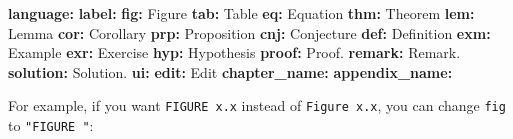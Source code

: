 \documentclass[
  12pt,
]{krantz}
\newenvironment{Shaded}{\begin{snugshade}}{\end{snugshade}}
\newcommand{\AttributeTok}[1]{\textcolor[rgb]{0.13,0.29,0.53}{#1}}
\newcommand{\FunctionTok}[1]{\textcolor[rgb]{0.13,0.29,0.53}{\textbf{#1}}}
\newcommand{\KeywordTok}[1]{\textcolor[rgb]{0.13,0.29,0.53}{\textbf{#1}}}
\newcommand{\StringTok}[1]{\textcolor[rgb]{0.31,0.60,0.02}{#1}}
\theoremstyle{definition}
\theoremstyle{definition}
\theoremstyle{definition}
\theoremstyle{definition}
\theoremstyle{remark}
\begin{document}
\begin{Shaded}
\begin{Highlighting}[]
\FunctionTok{language}\KeywordTok{:}
\AttributeTok{  }\FunctionTok{label}\KeywordTok{:}
\AttributeTok{    }\FunctionTok{fig}\KeywordTok{:}\AttributeTok{ }\StringTok{\textquotesingle{}Figure \textquotesingle{}}
\AttributeTok{    }\FunctionTok{tab}\KeywordTok{:}\AttributeTok{ }\StringTok{\textquotesingle{}Table \textquotesingle{}}
\AttributeTok{    }\FunctionTok{eq}\KeywordTok{:}\AttributeTok{ }\StringTok{\textquotesingle{}Equation \textquotesingle{}}
\AttributeTok{    }\FunctionTok{thm}\KeywordTok{:}\AttributeTok{ }\StringTok{\textquotesingle{}Theorem \textquotesingle{}}
\AttributeTok{    }\FunctionTok{lem}\KeywordTok{:}\AttributeTok{ }\StringTok{\textquotesingle{}Lemma \textquotesingle{}}
\AttributeTok{    }\FunctionTok{cor}\KeywordTok{:}\AttributeTok{ }\StringTok{\textquotesingle{}Corollary \textquotesingle{}}
\AttributeTok{    }\FunctionTok{prp}\KeywordTok{:}\AttributeTok{ }\StringTok{\textquotesingle{}Proposition \textquotesingle{}}
\AttributeTok{    }\FunctionTok{cnj}\KeywordTok{:}\AttributeTok{ }\StringTok{\textquotesingle{}Conjecture \textquotesingle{}}
\AttributeTok{    }\FunctionTok{def}\KeywordTok{:}\AttributeTok{ }\StringTok{\textquotesingle{}Definition \textquotesingle{}}
\AttributeTok{    }\FunctionTok{exm}\KeywordTok{:}\AttributeTok{ }\StringTok{\textquotesingle{}Example \textquotesingle{}}
\AttributeTok{    }\FunctionTok{exr}\KeywordTok{:}\AttributeTok{ }\StringTok{\textquotesingle{}Exercise \textquotesingle{}}
\AttributeTok{    }\FunctionTok{hyp}\KeywordTok{:}\AttributeTok{ }\StringTok{\textquotesingle{}Hypothesis \textquotesingle{}}
\AttributeTok{    }\FunctionTok{proof}\KeywordTok{:}\AttributeTok{ }\StringTok{\textquotesingle{}Proof. \textquotesingle{}}
\AttributeTok{    }\FunctionTok{remark}\KeywordTok{:}\AttributeTok{ }\StringTok{\textquotesingle{}Remark. \textquotesingle{}}
\AttributeTok{    }\FunctionTok{solution}\KeywordTok{:}\AttributeTok{ }\StringTok{\textquotesingle{}Solution. \textquotesingle{}}
\AttributeTok{  }\FunctionTok{ui}\KeywordTok{:}
\AttributeTok{    }\FunctionTok{edit}\KeywordTok{:}\AttributeTok{ Edit}
\AttributeTok{    }\FunctionTok{chapter\_name}\KeywordTok{:}\AttributeTok{ }\StringTok{\textquotesingle{}\textquotesingle{}}
\AttributeTok{    }\FunctionTok{appendix\_name}\KeywordTok{:}\AttributeTok{ }\StringTok{\textquotesingle{}\textquotesingle{}}
\end{Highlighting}
\end{Shaded}

For example, if you want \texttt{FIGURE\ x.x} instead of \texttt{Figure\ x.x}, you can change \texttt{fig} to \texttt{"FIGURE\ "}:
\end{document}
